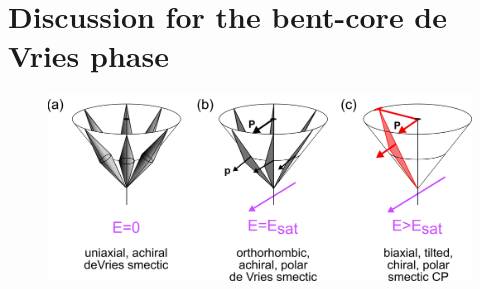 \documentclass[aagreenthesis]{subfiles}
\begin{document}
\section{Discussion for the bent-core de Vries phase}
\begin{figure}[h!]
    \centering
    \includegraphics{figs/pal30/deVries/dvAlign.png}
    \caption{\label{}}
\end{figure}
\end{document}
